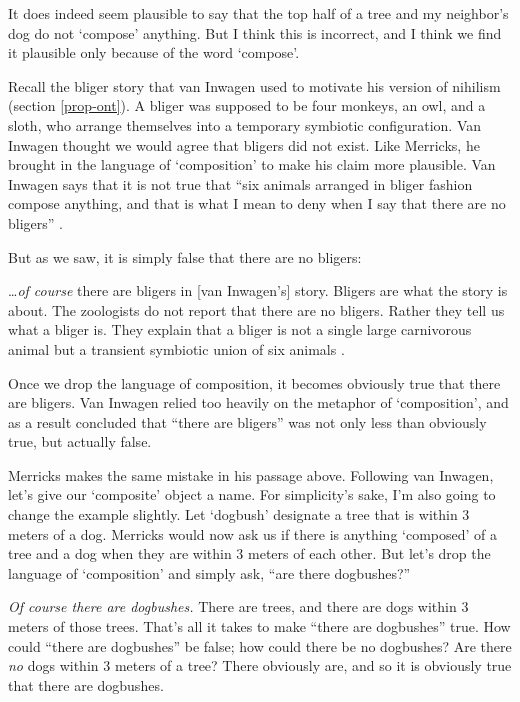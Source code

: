 \documentclass[11pt]{article}
\newenvironment{squote}{%
\begin{spacing}{1}
       	\begin{list}{}{%
\setlength{\labelwidth}{0pt}%
\rightmargin\leftmargin%
}
\item\relax
}{%
\end{list}%
\end{spacing}
}
\begin{document}
\begin{spacing}{1.25}
It does indeed seem plausible to say that the top half of a tree and
my neighbor's dog do not `compose' anything.  But I think this is
incorrect, and I think we find it plausible only because of the word
`compose'.

Recall the bliger story that van Inwagen used to motivate his version
of nihilism (section \ref{prop-ont}).  A bliger was supposed to be
four monkeys, an owl, and a sloth, who arrange themselves into a
temporary symbiotic configuration.  Van Inwagen thought we would agree
that bligers did not exist.  Like Merricks, he brought in the language
of `composition' to make his claim more plausible.  Van Inwagen says
that it is not true that ``six animals arranged in bliger fashion
compose anything, and that is what I mean to deny when I say that
there are no bligers'' \citeyearpar[104]{inwagen1995}.

But as we saw, it is simply false that there are no bligers:

\begin{squote}
\ldots {\em of course} there are bligers in [van Inwagen's] story.
Bligers are what the story is about.  The zoologists do not report
that there are no bligers.  Rather they tell us what a bliger is.
They explain that a bliger is not a single large carnivorous animal
but a transient symbiotic union of six animals
\citep[704]{rosenberg1993}.
\end{squote}

Once we drop the language of composition, it becomes obviously true
that there are bligers.  Van Inwagen relied too heavily on the
metaphor of `composition', and as a result concluded that ``there are
bligers'' was not only less than obviously true, but actually false.

Merricks makes the same mistake in his passage above.  Following van
Inwagen, let's give our `composite' object a name.  For simplicity's
sake, I'm also going to change the example slightly.  Let `dogbush'
designate a tree that is within 3 meters of a dog.  Merricks would now
ask us if there is anything `composed' of a tree and a dog when they
are within 3 meters of each other.  But let's drop the language of
`composition' and simply ask, ``are there dogbushes?''

{\em Of course there are dogbushes.}  There are trees, and there are
dogs within 3 meters of those trees.  That's all it takes to make
``there are dogbushes'' true.  How could ``there are dogbushes'' be
false; how could there be no dogbushes?  Are there {\em no} dogs
within 3 meters of a tree?  There obviously are, and so it is
obviously true that there are dogbushes.  


\end{spacing}
\end{document}
